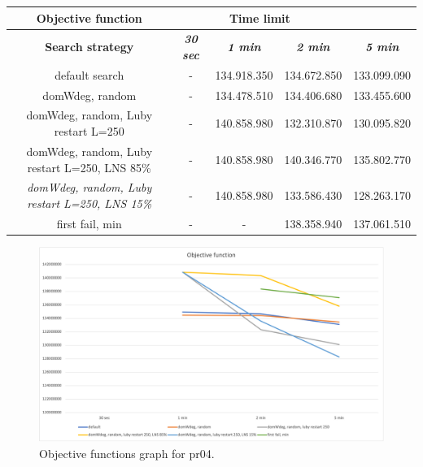 {
\renewcommand{\arraystretch}{2}
\begin{longtable}[h]{| c | c | c | c | c |}
    \hline
    \textbf{Objective function} & \multicolumn{3}{c}{Time limit} & \\
    \hline
    \textbf{Search strategy} & \textbf{\textit{30 sec}} & \textbf{\textit{1 min}} & \textbf{\textit{2 min}} & \textbf{\textit{5 min}} \\
    \hline
    \endhead
    default search                                         &         - & 134.918.350 & 134.672.850 & 133.099.090 \\
    \hline
    domWdeg, random                                        &         - & 134.478.510 & 134.406.680 & 133.455.600 \\
    \hline
    domWdeg, random, Luby restart L=250                    &         - & 140.858.980 & 132.310.870 & 130.095.820 \\
    \hline
    domWdeg, random, Luby restart L=250, LNS 85\%          &         - & 140.858.980 & 140.346.770 & 135.802.770 \\
    \hline
    \textit{domWdeg, random, Luby restart L=250, LNS 15\%} &         - & 140.858.980 & 133.586.430 & 128.263.170 \\
    \hline
    first fail, min                                        &        - &         - & 138.358.940 & 137.061.510 \\
    \hline
\end{longtable}
}
\begin{figure}[H]
    \centering
    \includegraphics[width=1.0\columnwidth]{../graphs/pr04-objf.png}
    \caption{Objective functions graph for pr04.}
\end{figure}

